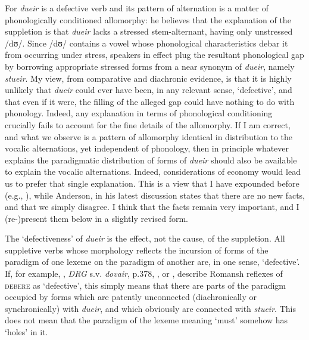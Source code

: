 \documentclass[output=paper,
modfonts
]{LSP/langsci}
\begin{document}
For \citet{anderson2008a,anderson2010a} \emph{dueir} is a defective verb and its
pattern of alternation is a matter of phonologically conditioned
allomorphy: he believes that the explanation of the suppletion is that
\emph{dueir} lacks a stressed stem-alternant, having only unstressed
/dʊ/. Since /dʊ/ contains a vowel whose phonological characteristics
debar it from occurring under stress, speakers in effect plug the
resultant phonological gap by borrowing appropriate stressed forms from
a near synonym of \emph{dueir}, namely \emph{stueir}. My view, from
comparative and diachronic evidence, is that it is highly unlikely that
\emph{dueir} could ever have been, in any relevant sense, `defective',
and that even if it were, the filling of the alleged gap could have
nothing to do with phonology. Indeed, any explanation in terms of
phonological conditioning crucially fails to account for the fine
details of the allomorphy. If I am correct, and what we observe is a
pattern of allomorphy identical in distribution to the vocalic
alternations, yet independent of phonology, then in principle whatever
explains the paradigmatic distribution of forms of \emph{dueir} should
also be available to explain the vocalic alternations. Indeed,
considerations of economy would lead us to prefer that single
explanation. This is a view that I have expounded before (e.g., \citealt[46--49]{maiden2011a}), while Anderson, in his latest discussion \citeyear[8]{anderson2013stem} states
that there are no new facts, and that we simply disagree. I think that
the facts remain very important, and I (re-)present them below in a
slightly revised form.

The `defectiveness' of \emph{dueir} is the effect, not the cause, of the
suppletion. All suppletive verbs whose morphology reflects the incursion
of forms of the paradigm of one lexeme on the paradigm of another are,
in one sense, `defective'. If, for example, \citet[89f.n5]{grisch1939a},
\emph{DRG} s.v. \emph{dovair}, p.378, \citet[155;158]{decurtins1958a}, or
\citet[165f]{signorell1987a}, describe Romansh reflexes of
\textsc{debere} as `defective', this simply means that there are parts
of the paradigm occupied by forms which are patently unconnected
(diachronically or synchronically) with \emph{dueir}, and which
obviously are connected with \emph{stueir}. This does not mean that the
paradigm of the lexeme meaning `must' somehow has `holes' in it.
\end{document}
